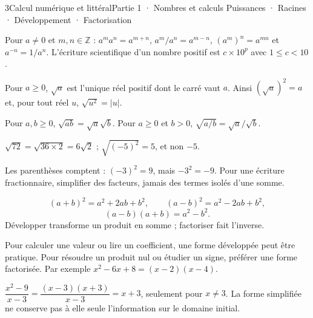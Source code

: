 \begin{ouverture}[courbe]{3}{Calcul numérique et littéral}{Partie 1 · Nombres et calculs}
{Puissances · Racines · Développement · Factorisation}
\end{ouverture}
\pagestyle{otMain}\essentiel\fontsize{11}{15}\selectfont
{}
\begin{propriete}Pour $a\ne0$ et $m,n\in\mathbb Z$ : $a^ma^n=a^{m+n}$, $a^m/a^n=a^{m-n}$, $(a^m)^n=a^{mn}$ et $a^{-n}=1/a^n$. L’écriture scientifique d’un nombre positif est $c\times10^p$ avec $1\le c<10$.\end{propriete}
\begin{definition}Pour $a\ge0$, $\sqrt a$ est l’unique réel positif dont le carré vaut $a$. Ainsi $(\sqrt a)^2=a$ et, pour tout réel $u$, $\sqrt{u^2}=|u|$.\end{definition}
\begin{propriete}Pour $a,b\ge0$, $\sqrt{ab}=\sqrt a\sqrt b$. Pour $a\ge0$ et $b>0$, $\sqrt{a/b}=\sqrt a/\sqrt b$.\end{propriete}
\begin{exemple}$\sqrt{72}=\sqrt{36\times2}=6\sqrt2$ ; $\sqrt{(-5)^2}=5$, et non $-5$.\end{exemple}
\begin{savoirfaire}Les parenthèses comptent : $(-3)^2=9$, mais $-3^2=-9$. Pour une écriture fractionnaire, simplifier des facteurs, jamais des termes isolés d’une somme.\end{savoirfaire}
\clearpage
{}
\begin{propriete}
\[(a+b)^2=a^2+2ab+b^2,\qquad(a-b)^2=a^2-2ab+b^2,\]
\[(a-b)(a+b)=a^2-b^2.\]
Développer transforme un produit en somme ; factoriser fait l’inverse.
\end{propriete}
\begin{savoirfaire}
Pour calculer une valeur ou lire un coefficient, une forme développée peut être pratique. Pour résoudre un produit nul ou étudier un signe, préférer une forme factorisée. Par exemple $x^2-6x+8=(x-2)(x-4)$.
\end{savoirfaire}
\begin{exemple}
$\dfrac{x^2-9}{x-3}=\dfrac{(x-3)(x+3)}{x-3}=x+3$, seulement pour $x\ne3$. La forme simplifiée ne conserve pas à elle seule l’information sur le domaine initial.
\end{exemple}
